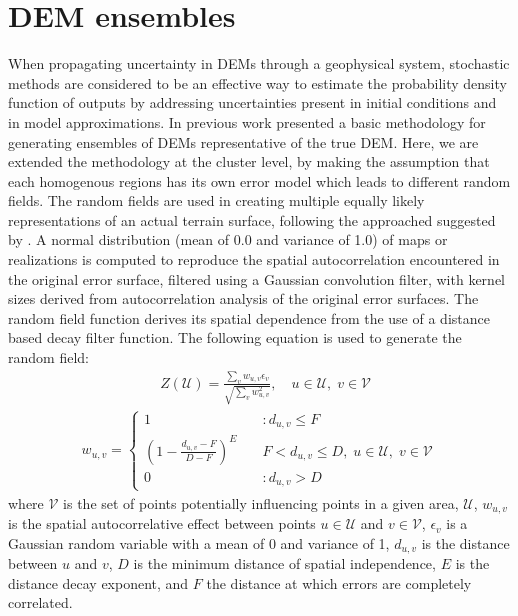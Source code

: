 \documentclass[12pt,letterpaper]{article}
\begin{document}
\section{DEM ensembles}
When propagating uncertainty in DEMs through a geophysical system, stochastic methods are considered to 
be an effective way to estimate the probability density function of outputs by addressing uncertainties present in 
initial conditions and in model approximations.
In previous work \cite{stefanescuPRS2012} presented a basic methodology for generating
ensembles of DEMs representative of the true DEM. Here, we are extended the methodology at the cluster level, 
by making the assumption that each homogenous regions has its own error model which leads to different random 
fields. The random fields are used in creating multiple equally likely representations of an actual terrain
surface, following the approached suggested by \cite{Ehlschlaeger_1994}.
A normal distribution (mean of 0.0 and variance of 1.0) of maps or realizations is computed to reproduce the 
spatial autocorrelation encountered in the original error surface, filtered using a Gaussian convolution filter, with 
kernel sizes derived from autocorrelation analysis of the original error surfaces.
The random field function derives its spatial dependence from the use of a distance
based decay filter function. The following equation is used to
generate the random field:
\begin{align}
  &Z(\mathcal{U})= \frac{\sum_v w_{u,v}\epsilon_v}{\sqrt{\sum_v
      w_{u,v}^2}}, \quad u\in \mathcal{U}, \; v \in \mathcal{V}
 \label{eqn1}
 \end{align}
 \begin{align}
   w_{u,v} = \left\{ \begin{array}{ll} 1 & \quad :d_{u,v} \le F \\
       \left(1- \frac{d_{u,v} - F}{D - F} \right)^E & \quad F <
       d_{u,v} \le D, \; u \in \mathcal{U}, \; v \in \mathcal{V}\\ 0 &
       \quad :d_{u,v} > D
\end{array} \right.
\label{eqn2}                                                    
\end{align}
where $\mathcal{V}$ is the set of points potentially influencing
points in a given area, $\mathcal{U}$, $w_{u,v}$ is the spatial
autocorrelative effect between points $u \in \mathcal{U}$ and $v \in
\mathcal{V}$, $\epsilon_v$ is a Gaussian random variable with a mean of 0 and
variance of 1, $d_{u,v}$ is the distance between $u$ and $v$, $D$ is
the minimum distance of spatial independence, $E$ is the distance
decay exponent, and $F$ the distance at which errors are completely
correlated.
\end{document}
